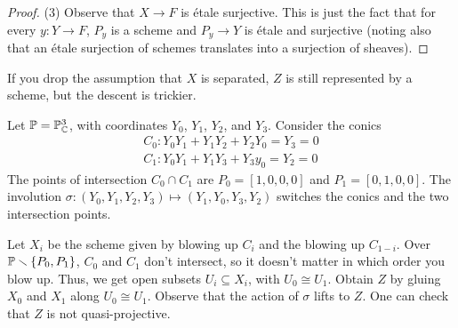 \begin{proof}

   (3) Observe that $X\to F$ is \'etale surjective. This is just the fact that for every
   $y:Y\to F$, $P_y$ is a scheme and $P_y\to Y$ is \'etale and surjective (noting also
   that an \'etale surjection of schemes translates into a surjection of sheaves).
 \end{proof}
 \begin{remark}
   If you drop the assumption that $X$ is separated, $Z$ is still represented by a
   scheme, but the descent is trickier.
 \end{remark}


 Let $\mathbb{P}=\mathbb{P}_{\mathbb{C}}^3$, with coordinates $Y_0$, $Y_1$, $Y_2$, and $Y_3$.  Consider the conics
 \begin{gather*}
   C_0: Y_0Y_1+Y_1Y_2 + Y_2Y_0=Y_3=0\\
   C_1: Y_0Y_1+Y_1Y_3+Y_3y_0=Y_2=0
 \end{gather*}
 The points of intersection $C_0\cap C_1$ are $P_0=[1,0,0,0]$ and $P_1=[0,1,0,0]$. The
 involution $\sigma: (Y_0,Y_1,Y_2, Y_3)\mapsto (Y_1,Y_0,Y_3,Y_2)$ switches the
 conics and the two intersection points.

 Let $X_i$ be the scheme given by blowing up $C_i$ and the blowing up $C_{1-i}$. Over
 $\mathbb{P}\smallsetminus\{P_0,P_1\}$, $C_0$ and $C_1$ don't intersect, so it doesn't matter in
 which order you blow up. Thus, we get open subsets $U_i\subseteq X_i$, with $U_0\cong
 U_1$. Obtain $Z$ by gluing $X_0$ and $X_1$ along $U_0\cong U_1$. Observe that the action
 of $\sigma$ lifts to $Z$. One can check that $Z$ is not quasi-projective.


